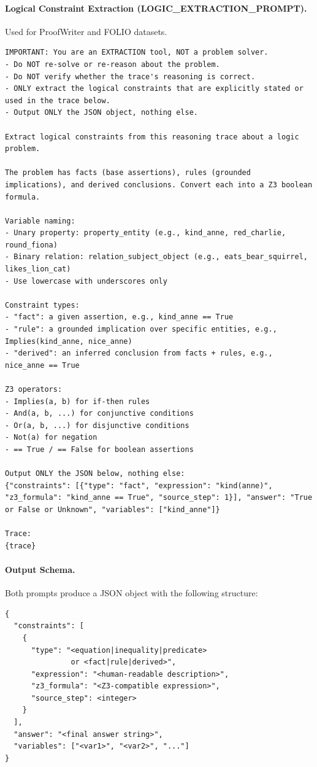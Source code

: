 \paragraph{Logical Constraint Extraction (LOGIC\_EXTRACTION\_PROMPT).}

Used for ProofWriter and FOLIO datasets.

\begin{lstlisting}
IMPORTANT: You are an EXTRACTION tool, NOT a problem solver.
- Do NOT re-solve or re-reason about the problem.
- Do NOT verify whether the trace's reasoning is correct.
- ONLY extract the logical constraints that are explicitly stated or used in the trace below.
- Output ONLY the JSON object, nothing else.

Extract logical constraints from this reasoning trace about a logic problem.

The problem has facts (base assertions), rules (grounded implications), and derived conclusions. Convert each into a Z3 boolean formula.

Variable naming:
- Unary property: property_entity (e.g., kind_anne, red_charlie, round_fiona)
- Binary relation: relation_subject_object (e.g., eats_bear_squirrel, likes_lion_cat)
- Use lowercase with underscores only

Constraint types:
- "fact": a given assertion, e.g., kind_anne == True
- "rule": a grounded implication over specific entities, e.g., Implies(kind_anne, nice_anne)
- "derived": an inferred conclusion from facts + rules, e.g., nice_anne == True

Z3 operators:
- Implies(a, b) for if-then rules
- And(a, b, ...) for conjunctive conditions
- Or(a, b, ...) for disjunctive conditions
- Not(a) for negation
- == True / == False for boolean assertions

Output ONLY the JSON below, nothing else:
{"constraints": [{"type": "fact", "expression": "kind(anne)", "z3_formula": "kind_anne == True", "source_step": 1}], "answer": "True or False or Unknown", "variables": ["kind_anne"]}

Trace:
{trace}
\end{lstlisting}

\paragraph{Output Schema.}

Both prompts produce a JSON object with the following structure:

\begin{lstlisting}
{
  "constraints": [
    {
      "type": "<equation|inequality|predicate>
               or <fact|rule|derived>",
      "expression": "<human-readable description>",
      "z3_formula": "<Z3-compatible expression>",
      "source_step": <integer>
    }
  ],
  "answer": "<final answer string>",
  "variables": ["<var1>", "<var2>", "..."]
}
\end{lstlisting}

